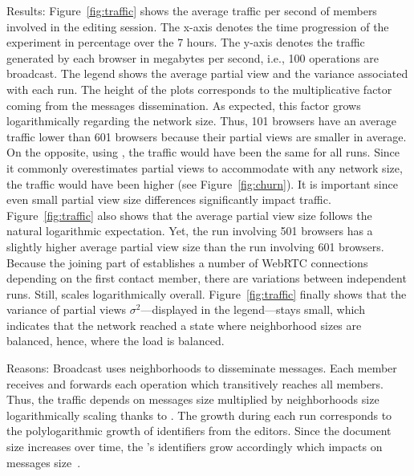 \begin{asparadesc}
\item [Results:] Figure~\ref{fig:traffic} shows the average traffic
  per second of members involved in the editing session. The x-axis
  denotes the time progression of the experiment in percentage over
  the 7 hours. The y-axis denotes the traffic generated by each
  browser in megabytes per second, i.e., 100 operations are
  broadcast. The legend shows the average partial view and the
  variance associated with each run. The height of the plots
  corresponds to the multiplicative factor coming from the messages
  dissemination. As expected, this factor grows logarithmically
  regarding the network size. Thus, 101 browsers have an average
  traffic lower than 601 browsers because their partial views are
  smaller in average.  On the opposite, using \CYCLON, the traffic
  would have been the same for all runs. Since it commonly
  overestimates partial views to accommodate with any network size,
  the traffic would have been higher (see Figure~\ref{fig:churn}). It
  is important since even small partial view size differences
  significantly impact traffic.  Figure~\ref{fig:traffic} also shows
  that the average partial view size follows the natural logarithmic
  expectation. Yet, the run involving 501 browsers has a slightly
  higher average partial view size than the run involving 601
  browsers. Because the joining part of \SPRAY establishes a number of
  WebRTC connections depending on the first contact member, there are
  variations between independent runs. Still, \SPRAY scales
  logarithmically overall. Figure~\ref{fig:traffic} finally shows that
  the variance of partial views $\sigma^2$---displayed in the
  legend---stays small, which indicates that the network reached a
  state where neighborhood sizes are balanced, hence, where the load is
  balanced.
\item [Reasons:] Broadcast uses neighborhoods to disseminate messages. Each
  member receives and forwards each operation which transitively reaches all
  members. Thus, the traffic depends on messages size multiplied by
  neighborhoods size logarithmically scaling thanks to \SPRAY. The growth during
  each run corresponds to the polylogarithmic growth of identifiers from the
  editors. Since the document size increases over time, the \LSEQ's identifiers
  grow accordingly which impacts on messages size~\cite{nedelec2013lseq}.
\end{asparadesc}




